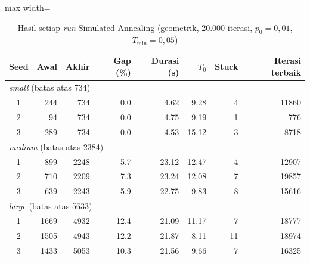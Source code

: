 \begin{table}[H]\centering\small
\caption{Hasil setiap \textit{run} Simulated Annealing (geometrik, 20.000 iterasi, $p_0=0{,}01$, $T_{\min}=0{,}05$)}\label{tab:sa-runs}
\begin{adjustbox}{max width=\textwidth}\begin{tabular}{c r r r r r r r}
\toprule
\textbf{Seed} & \textbf{Awal} & \textbf{Akhir} & \textbf{Gap (\%)} & \textbf{Durasi (s)} & \textbf{$T_0$} & \textbf{Stuck} & \textbf{Iterasi terbaik} \\
\midrule
\multicolumn{8}{l}{\textit{small} (batas atas 734)} \\
1 & 244 & 734 & 0.0 & 4.62 & 9.28 & 4 & 11860 \\
2 & 94 & 734 & 0.0 & 4.75 & 9.19 & 1 & 776 \\
3 & 289 & 734 & 0.0 & 4.53 & 15.12 & 3 & 8718 \\
\midrule
\multicolumn{8}{l}{\textit{medium} (batas atas 2384)} \\
1 & 899 & 2248 & 5.7 & 23.12 & 12.47 & 4 & 12907 \\
2 & 710 & 2209 & 7.3 & 23.24 & 12.08 & 7 & 19857 \\
3 & 639 & 2243 & 5.9 & 22.75 & 9.83 & 8 & 15616 \\
\midrule
\multicolumn{8}{l}{\textit{large} (batas atas 5633)} \\
1 & 1669 & 4932 & 12.4 & 21.09 & 11.17 & 7 & 18777 \\
2 & 1505 & 4943 & 12.2 & 21.87 & 8.11 & 11 & 18974 \\
3 & 1433 & 5053 & 10.3 & 21.56 & 9.66 & 7 & 16325 \\
\bottomrule
\end{tabular}\end{adjustbox}
\end{table}
